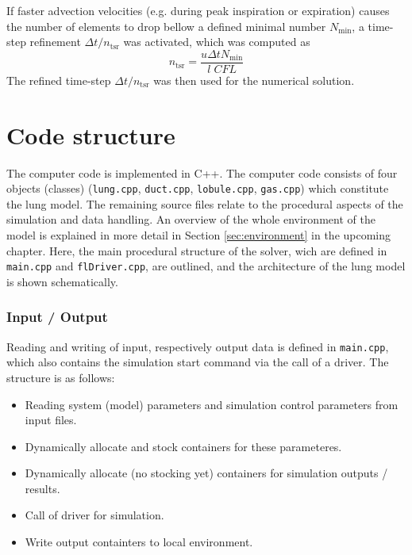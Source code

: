 If faster advection velocities (e.g. during peak inspiration or expiration) causes the number of elements to drop bellow a defined minimal number
$N_\mathrm{min}$, a time-step refinement $\Delta t / n_\mathrm{tsr}$ was activated, which was computed as
\begin{equation}
  n_\mathrm{tsr} = \frac{u \Delta t N_\mathrm{min}}{l\;CFL}
\end{equation}
The refined time-step $\Delta t / n_\mathrm{tsr}$ was then used for the numerical solution.



\section{Code structure} \label{sec:code_structure}
The computer code is implemented in C++.
The computer code consists of four objects (classes) (\texttt{lung.cpp}, \texttt{duct.cpp}, \texttt{lobule.cpp}, \texttt{gas.cpp}) which constitute the lung model.
The remaining source files relate to the procedural aspects of the simulation and data handling.
An overview of the whole environment of the model is explained in more detail in Section \ref{sec:environment} in the upcoming chapter.
Here, the main procedural structure of the solver, wich are defined in \texttt{main.cpp} and \texttt{flDriver.cpp}, are outlined, and the architecture of the lung model is shown schematically.

\subsubsection{Input / Output}
Reading and writing of input, respectively output data is defined in \texttt{main.cpp}, which also contains the simulation start command via the
call of a driver.
The structure is as follows:
\begin{itemize}
  \item Reading system (model) parameters and simulation control parameters from input files.
  \item Dynamically allocate and stock containers for these parameteres.
  \item Dynamically allocate (no stocking yet) containers for simulation outputs / results.
  \item Call of driver for simulation.
  \item Write output containters to local environment.
\end{itemize}

